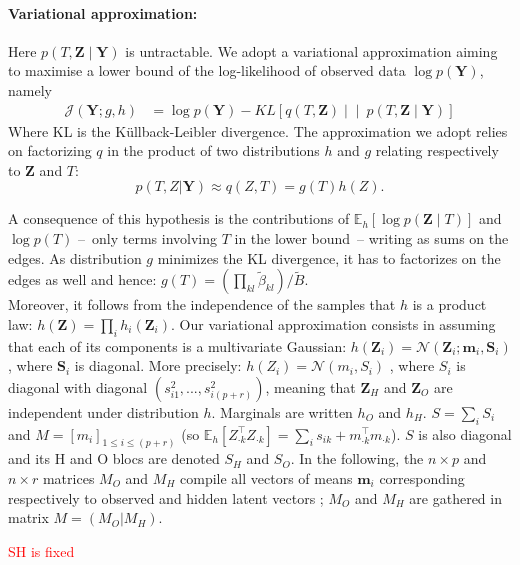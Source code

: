 \documentclass[11pt,a4paper]{article}
\newcommand{\Ybf}{\boldsymbol{Y}}
\newcommand{\Zbf}{\boldsymbol{Z}}
\newcommand{\Sbf}{\boldsymbol{S}}
\newcommand{\mbf}{\boldsymbol{m}}
\newcommand\Ncal{\mathcal{N}}
\newcommand{\Esp}{\mathds{E}}
\begin{document}
\paragraph{Variational approximation:}

Here $p(T,\Zbf \mid \Ybf)$ is untractable. We adopt a variational approximation aiming to maximise a lower bound of the log-likelihood of observed data $\log p(\Ybf)$, namely  
\begin{align*}
    \mathcal{J}(\Ybf; g,h)
    & = \log p(\Ybf) - KL\left[q(T,\Zbf) \middle\vert\middle\vert\ p(T,\Zbf \mid \Ybf)\right]
\end{align*}
Where KL is the Küllback-Leibler divergence. The approximation we adopt relies on factorizing $q$ in the product of two distributions $h$ and $g$ relating respectively to $\Zbf$  and $T$: 
$$p(T,Z | \Ybf) \approx  q(Z,T) = g(T)h(Z).$$

 A consequence of this hypothesis is the contributions of   $\Esp_h[\log p(\Zbf\mid T)]$ and $\log p(T)$ --~only terms involving $T$ in the lower bound~-- writing as sums on the edges. As distribution   $g$ minimizes the KL divergence, it has to factorizes on the edges as well and hence:
$ g(T) = \left(\prod_{kl} \widetilde{\beta}_{kl} \right) / \widetilde{B}$. \\
 
Moreover, it follows from the independence of the samples that $h$ is a product law: $ h(\Zbf) = \prod_i h_i(\Zbf_i)$.
Our variational approximation consists in assuming that each of its components is a multivariate Gaussian: $h(\Zbf_i) = \Ncal(\Zbf_i; \mbf_i, \Sbf_i)$, where $\Sbf_i$ is diagonal. More precisely:  $ h(Z_i) =  \mathcal{N}(m_i,S_i)$ , where $S_i$ is diagonal with diagonal $(s_{i1}^2, ... , s_{i(p+r)}^2)$, meaning that $\Zbf_H$ and $\Zbf_O$ are independent under distribution $h$. Marginals are written $h_O$  and  $h_H$. $S=\sum_i S_i$  and $ M =  [m_i]_{1 \leq i \leq (p+r)}$ (so $\Esp_h[Z_{\cdot k}^\intercal Z_{\cdot k}] = \sum_i s_{ik} + m_{\cdot k}^\intercal m_{\cdot k}$). $S$ is also diagonal and its H and O blocs are denoted $S_H$ and $S_O$. In the following, the $n\times p $ and $n\times r $ matrices $M_O$ and  $M_H$ compile all vectors of means $\mbf_i$ corresponding respectively to observed and hidden latent vectors ; $M_O$ and  $M_H$ are gathered in matrix $M= (M_O | M_H)$.

\textcolor{red}{SH is fixed}
\end{document}
